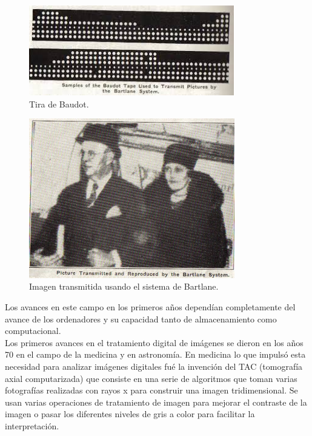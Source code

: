 \documentclass[a4paper,12pt]{report}
\begin{document}
\begin{figure}[h]
\centering
\includegraphics[width=0.8\textwidth]{imagenes/telegrafo}
\caption{Tira de Baudot.}
\label{telegrafo}
\end{figure}

\begin{figure}[h]
\centering
\includegraphics[width=0.8\textwidth]{imagenes/1digital}
\caption{Imagen transmitida usando el sistema de Bartlane.}
\label{1digital}
\end{figure}

Los avances en este campo en los primeros años dependían completamente del avance de los ordenadores y su capacidad tanto de almacenamiento como computacional.\\

Los primeros avances en el tratamiento digital de imágenes se dieron en los años 70 en el campo de la medicina y en astronomía. En medicina lo que impulsó esta necesidad para analizar imágenes digitales fué la invención del TAC (tomografía axial computarizada) que consiste en una serie de algoritmos que toman varias fotografías realizadas con rayos x para construir una imagen tridimensional. Se usan varias operaciones de tratamiento de imagen para mejorar el contraste de la imagen o pasar los diferentes niveles de gris a color para facilitar la interpretación.\\
\end{document}
